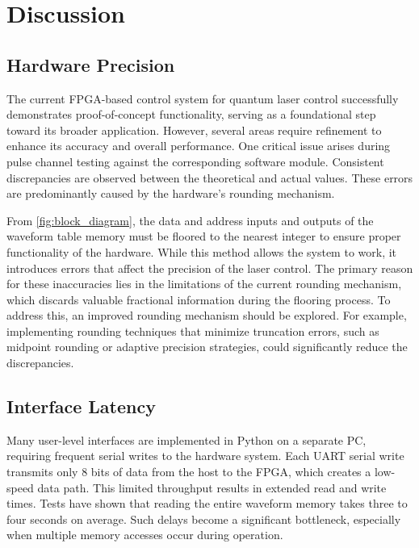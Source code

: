 \chapter{Discussion}

\section{Hardware Precision}

The current FPGA-based control system for quantum laser control successfully demonstrates proof-of-concept functionality, serving as a foundational step toward its broader application. However, several areas require refinement to enhance its accuracy and overall performance. One critical issue arises during pulse channel testing against the corresponding software module. Consistent discrepancies are observed between the theoretical and actual values. These errors are predominantly caused by the hardware's rounding mechanism.

From \autoref{fig:block_diagram}, the data and address inputs and outputs of the waveform table memory must be floored to the nearest integer to ensure proper functionality of the hardware. While this method allows the system to work, it introduces errors that affect the precision of the laser control. The primary reason for these inaccuracies lies in the limitations of the current rounding mechanism, which discards valuable fractional information during the flooring process. To address this, an improved rounding mechanism should be explored. For example, implementing rounding techniques that minimize truncation errors, such as midpoint rounding or adaptive precision strategies, could significantly reduce the discrepancies.

\section{Interface Latency}
Many user-level interfaces are implemented in Python on a separate PC, requiring frequent serial writes to the hardware system. Each UART serial write transmits only 8 bits of data from the host to the FPGA, which creates a low-speed data path. This limited throughput results in extended read and write times. Tests have shown that reading the entire waveform memory takes three to four seconds on average. Such delays become a significant bottleneck, especially when multiple memory accesses occur during operation.

